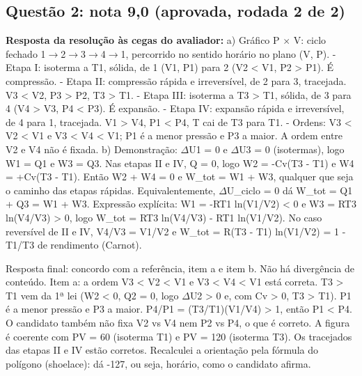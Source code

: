 \documentclass{article}%
\begin{document}
\subsection*{Questão 2: nota 9,0 (aprovada, rodada 2 de 2)}%
\textbf{Resposta da resolução às cegas do avaliador:} a) Gráfico P $\times$ V: ciclo fechado 1$\to$2$\to$3$\to$4$\to$1, percorrido no sentido horário no plano (V, P).\newline%
{-} Etapa I: isoterma a T1, sólida, de 1 (V1, P1) para 2 (V2 < V1, P2 > P1). É compressão.\newline%
{-} Etapa II: compressão rápida e irreversível, de 2 para 3, tracejada. V3 < V2, P3 > P2, T3 > T1.\newline%
{-} Etapa III: isoterma a T3 > T1, sólida, de 3 para 4 (V4 > V3, P4 < P3). É expansão.\newline%
{-} Etapa IV: expansão rápida e irreversível, de 4 para 1, tracejada. V1 > V4, P1 < P4, T cai de T3 para T1.\newline%
{-} Ordens: V3 < V2 < V1 e V3 < V4 < V1; P1 é a menor pressão e P3 a maior. A ordem entre V2 e V4 não é fixada.\newline%
\newline%
b) Demonstração: $\Delta$U1 = 0 e $\Delta$U3 = 0 (isotermas), logo W1 = Q1 e W3 = Q3. Nas etapas II e IV, Q = 0, logo W2 = -Cv(T3 - T1) e W4 = +Cv(T3 - T1). Então W2 + W4 = 0 e W\_tot = W1 + W3, qualquer que seja o caminho das etapas rápidas. Equivalentemente, $\Delta$U\_ciclo = 0 dá W\_tot = Q1 + Q3 = W1 + W3.\newline%
Expressão explícita: W1 = -RT1 ln(V1/V2) < 0 e W3 = RT3 ln(V4/V3) > 0, logo W\_tot = RT3 ln(V4/V3) - RT1 ln(V1/V2).\newline%
No caso reversível de II e IV, V4/V3 = V1/V2 e W\_tot = R(T3 - T1) ln(V1/V2) = 1 - T1/T3 de rendimento (Carnot).\par %
Resposta final: concordo com a referência, item a e item b. Não há divergência de conteúdo.\newline%
\newline%
Item a: a ordem V3 < V2 < V1 e V3 < V4 < V1 está correta. T3 > T1 vem da 1ª lei (W2 < 0, Q2 = 0, logo $\Delta$U2 > 0 e, com Cv > 0, T3 > T1). P1 é a menor pressão e P3 a maior. P4/P1 = (T3/T1)(V1/V4) > 1, então P1 < P4. O candidato também não fixa V2 vs V4 nem P2 vs P4, o que é correto. A figura é coerente com PV = 60 (isoterma T1) e PV = 120 (isoterma T3). Os tracejados das etapas II e IV estão corretos. Recalculei a orientação pela fórmula do polígono (shoelace): dá -127, ou seja, horário, como o candidato afirma.\newline%
\end{document}

